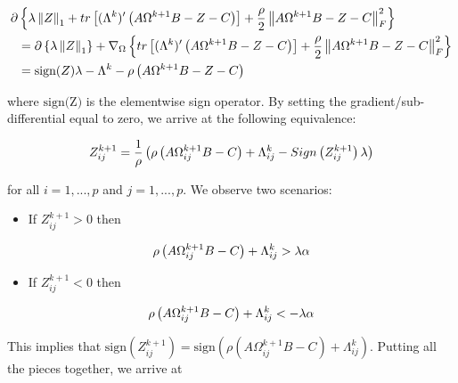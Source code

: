 \documentclass[11pt,]{report}
\providecommand{\tightlist}{%
  \setlength{\itemsep}{0pt}\setlength{\parskip}{0pt}}
\theoremstyle{definition}
\theoremstyle{definition}
\theoremstyle{definition}
\theoremstyle{remark}
\begin{document}
\begin{equation}
\begin{split}
  \partial&\left\{ \lambda\left\| Z \right\|_{1} + tr\left[(\Lambda^{k})'\left(A\Omega^{k + 1}B - Z - C\right)\right] + \frac{\rho}{2}\left\| A\Omega^{k + 1}B - Z - C \right\|_{F}^{2} \right\} \\
  &= \partial\left\{ \lambda\left\| Z \right\|_{1} \right\} + \nabla_{\Omega}\left\{ tr\left[(\Lambda^{k})'\left(A\Omega^{k + 1}B - Z - C\right)\right] + \frac{\rho}{2}\left\| A\Omega^{k + 1}B - Z - C \right\|_{F}^{2} \right\} \\
  &= \mbox{sign}(Z)\lambda - \Lambda^{k} - \rho\left( A\Omega^{k + 1}B - Z - C \right)
\label{eq:appendixZZgradient2}\notag
\end{split}
\end{equation}

where \(\mbox{sign(Z)}\) is the elementwise sign operator. By setting the gradient/sub-differential equal to zero, we arrive at the following equivalence:

\begin{equation}
Z_{ij}^{k + 1} = \frac{1}{\rho}\left( \rho\left(A\Omega_{ij}^{k + 1}B - C\right) + \Lambda_{ij}^{k} - Sign\left(Z_{ij}^{k + 1}\right)\lambda \right)
\label{eq:ZZsoftproof2}\notag
\end{equation}

for all \(i = 1,..., p\) and \(j = 1,..., p\). We observe two scenarios:

\begin{itemize}
\tightlist
\item
  If \(Z_{ij}^{k + 1} > 0\) then
\end{itemize}

\begin{equation}
\rho\left(A\Omega_{ij}^{k + 1}B - C\right) + \Lambda_{ij}^{k} > \lambda\alpha \notag
\end{equation}

\begin{itemize}
\tightlist
\item
  If \(Z_{ij}^{k + 1} < 0\) then
\end{itemize}

\begin{equation}
\rho\left(A\Omega_{ij}^{k + 1}B - C\right) + \Lambda_{ij}^{k} < -\lambda\alpha \notag
\end{equation}

This implies that \(\mbox{sign}\left(Z_{ij}^{k + 1}\right) = \mbox{sign}\left(\rho\left(A\Omega_{ij}^{k + 1}B - C\right) + \Lambda_{ij}^{k}\right)\). Putting all the pieces together, we arrive at
\end{document}
